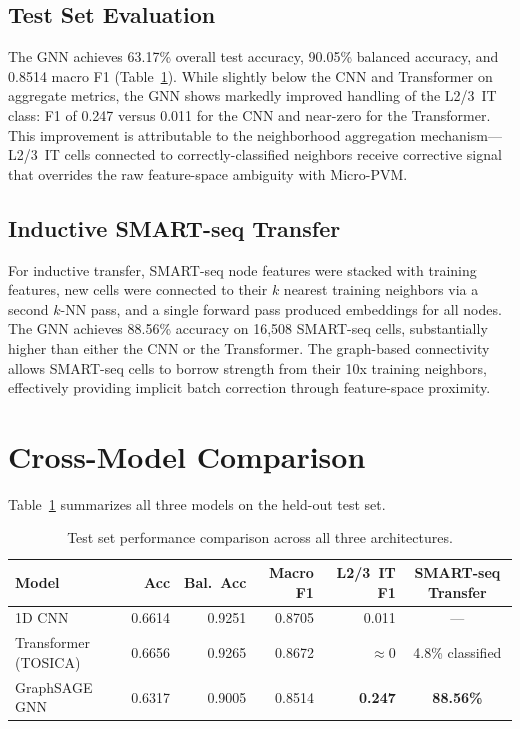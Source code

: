 \documentclass[11pt,letterpaper]{article}
\begin{document}
\subsection{Test Set Evaluation}
The GNN achieves 63.17\% overall test accuracy, 90.05\% balanced accuracy, and
0.8514 macro F1 (Table~\ref{tab:comparison}). While slightly below the CNN and
Transformer on aggregate metrics, the GNN shows markedly improved handling of
the L2/3~IT class: F1 of 0.247 versus 0.011 for the CNN and near-zero for the
Transformer. This improvement is attributable to the neighborhood aggregation
mechanism---L2/3~IT cells connected to correctly-classified neighbors receive
corrective signal that overrides the raw feature-space ambiguity with Micro-PVM.

\subsection{Inductive SMART-seq Transfer}
For inductive transfer, SMART-seq node features were stacked with training
features, new cells were connected to their $k$ nearest training neighbors via
a second $k$-NN pass, and a single forward pass produced embeddings for all
nodes. The GNN achieves 88.56\% accuracy on 16,508 SMART-seq cells, substantially
higher than either the CNN or the Transformer. The graph-based connectivity
allows SMART-seq cells to borrow strength from their 10x training neighbors,
effectively providing implicit batch correction through feature-space proximity.

\section{Cross-Model Comparison}

Table~\ref{tab:comparison} summarizes all three models on the held-out test set.

\begin{table}[H]
\centering
\caption{Test set performance comparison across all three architectures.}
\label{tab:comparison}
\begin{tabular}{@{}lrrrrc@{}}
\toprule
Model & Acc & Bal.\ Acc & Macro F1 & L2/3~IT F1 & SMART-seq Transfer \\
\midrule
1D CNN               & 0.6614 & 0.9251 & 0.8705 & 0.011          & ---                \\
Transformer (TOSICA) & 0.6656 & 0.9265 & 0.8672 & $\approx$0     & 4.8\% classified   \\
GraphSAGE GNN        & 0.6317 & 0.9005 & 0.8514 & \textbf{0.247} & \textbf{88.56\%}   \\
\bottomrule
\end{tabular}
\end{table}
\end{document}
